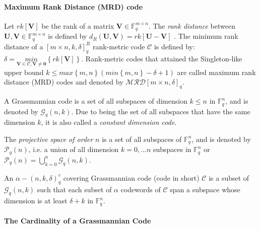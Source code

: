 \paragraph{Maximum Rank Distance (MRD) code}

Let $rk\left[\boldsymbol{V}\right]$ be the rank of a matrix $\boldsymbol{V}\in\ensuremath{\mathbb{F}}_{q}^{m\times n}$.
The \textit{rank distance} between $\boldsymbol{U},\boldsymbol{V}\in\ensuremath{\mathbb{F}}_{q}^{m\times n}$
is defined by $d_{R}\left(\boldsymbol{U},\boldsymbol{V}\right)=rk\left[\boldsymbol{U}-\boldsymbol{V}\right]$
\cite{Delsarte:1978,Gabidulin:1985,Roth:1991}. The minimum rank distance
of a $\left[m\times n,k,\delta\right]_{q}^{R}$ rank-metric code $\mathcal{C}$
is defined by: $\delta=\underset{\boldsymbol{V}\in\mathcal{C},\boldsymbol{V}\neq\boldsymbol{0}}{min}\left\{ rk\left[\boldsymbol{V}\right]\right\} $.
Rank-metric codes that attained the Singleton-like upper bound $k\leq max\left\{ m,n\right\} \left(min\left\{ m,n\right\} -\delta+1\right)$
\cite{Delsarte:1978,Gabidulin:1985,Roth:1991} are called maximum
rank distance (MRD) codes and denoted by $\mathcal{MRD}\left[m\times n,\delta\right]_{q}$.
\begin{defn}
 A Grassmannian code is a set of all subspaces of dimension $k\leq n$
in $\ensuremath{\mathbb{F}}_{q}^{n}$, and is denoted by $\mathcal{G}_{q}\left(n,k\right)$.
Due to being the set of all subspaces that have the same dimension
$k$, it is also called a \textit{constant dimension code}. 
\end{defn}
%
\begin{defn}
 The \textit{projective space of order} $n$ is a set of all subspaces
of $\ensuremath{\mathbb{F}}_{q}^{n}$, and is denoted by $\mathcal{P}_{q}\left(n\right)$,
i.e. a union of all dimension $k=0,\ldots n$ subspaces in $\ensuremath{\mathbb{F}}_{q}^{n}$
or $\mathcal{P}_{q}\left(n\right)=\bigcup_{k=0}^{n}\mathcal{G}_{q}\left(n,k\right)$. 
\end{defn}
%
\begin{defn}
 An $\alpha-\left(n,k,\delta\right)_{q}^{c}$ covering Grassmannian
code (code in short) $\mathcal{C}$ is a subset of $\mathcal{G}_{q}\left(n,k\right)$
such that each subset of $\alpha$ codewords of $\mathcal{C}$ span
a subspace whose dimension is at least $\delta+k$ in $\ensuremath{\mathbb{F}}_{q}^{n}$. 
\end{defn}

\paragraph{The Cardinality of a Grassmannian Code \cite{Zhang:2019}}

